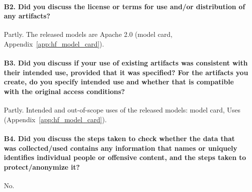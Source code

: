\paragraph{B2. Did you discuss the license or terms for use and/or distribution of any artifacts?}
Partly. The released models are Apache 2.0 (model card, Appendix~\ref{app:hf_model_card}).

\paragraph{B3. Did you discuss if your use of existing artifacts was consistent with their intended use, provided that it was specified? For the artifacts you create, do you specify intended use and whether that is compatible with the original access conditions?}
Partly. Intended and out-of-scope uses of the released models: model card, Uses (Appendix~\ref{app:hf_model_card}).

\paragraph{B4. Did you discuss the steps taken to check whether the data that was collected/used contains any information that names or uniquely identifies individual people or offensive content, and the steps taken to protect/anonymize it?}
No.

